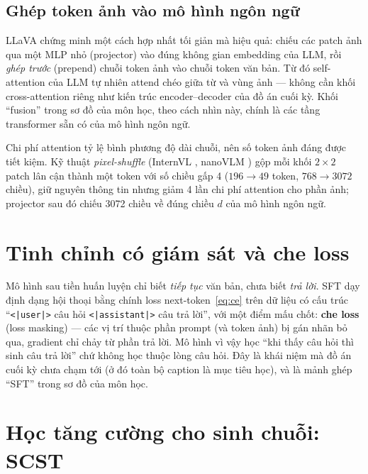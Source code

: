 \subsection{Ghép token ảnh vào mô hình ngôn ngữ}

LLaVA \autocite{liu2023llava} chứng minh một cách hợp nhất tối giản mà hiệu
quả: chiếu các patch ảnh qua một MLP nhỏ (projector) vào đúng không gian
embedding của LLM, rồi \emph{ghép trước} (prepend) chuỗi token ảnh vào chuỗi
token văn bản. Từ đó self-attention của LLM tự nhiên attend chéo giữa từ và
vùng ảnh --- không cần khối cross-attention riêng như kiến trúc
encoder--decoder của đồ án cuối kỳ. Khối ``fusion'' trong sơ đồ của môn học,
theo cách nhìn này, chính là các tầng transformer sẵn có của mô hình ngôn ngữ.

Chi phí attention tỷ lệ bình phương độ dài chuỗi, nên số token ảnh đáng được
tiết kiệm. Kỹ thuật \emph{pixel-shuffle} (InternVL \autocite{chen2024internvl},
nanoVLM \autocite{wiedmann2025nanovlm}) gộp mỗi khối $2 \times 2$ patch lân
cận thành một token với số chiều gấp 4 ($196 \to 49$ token, $768 \to 3072$
chiều), giữ nguyên thông tin nhưng giảm 4 lần chi phí attention cho phần ảnh;
projector sau đó chiếu 3072 chiều về đúng chiều $d$ của mô hình ngôn ngữ.

\section{Tinh chỉnh có giám sát và che loss}
\label{sec:bg-sft}

Mô hình sau tiền huấn luyện chỉ biết \emph{tiếp tục} văn bản, chưa biết
\emph{trả lời}. SFT dạy định dạng hội thoại bằng chính loss
next-token~\eqref{eq:ce} trên dữ liệu có cấu trúc
``\texttt{<|user|>} câu hỏi \texttt{<|assistant|>} câu trả lời'', với một
điểm mấu chốt: \textbf{che loss} (loss masking) --- các vị trí thuộc phần
prompt (và token ảnh) bị gán nhãn bỏ qua, gradient chỉ chảy từ phần trả lời.
Mô hình vì vậy học ``khi thấy câu hỏi thì sinh câu trả lời'' chứ không học
thuộc lòng câu hỏi. Đây là khái niệm mà đồ án cuối kỳ chưa chạm tới (ở đó
toàn bộ caption là mục tiêu học), và là mảnh ghép ``SFT'' trong sơ đồ của
môn học.

\section{Học tăng cường cho sinh chuỗi: SCST}
\label{sec:bg-scst}

